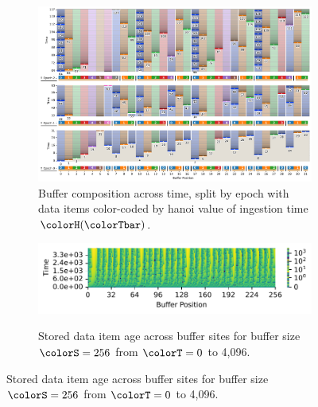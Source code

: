 \begin{figure}[htbp!]
  \centering

\begin{subfigure}[b]{\linewidth}
\includegraphics[width=\linewidth]{
binder/teeplots/20/num-generations=128+surface-size=32+viz=site-reservation-by-rank-spliced-at-heatmap+ext=}
\vspace{-4ex}\caption{
  Buffer composition across time, split by epoch with data items color-coded by hanoi value of ingestion time $\colorH(\colorTbar)$.
}
\label{fig:hsurf-tilted-implementation-schematic}
\end{subfigure}

\vspace{1ex}\begin{minipage}[]{\textwidth}
 \vspace{-2pt}
  \begin{subfigure}[t]{0.7\linewidth}
    \vspace{0pt}
    \centering
  \includegraphics[width=0.88\linewidth,clip]{binder/teeplots/20/cnorm=log+num-generations=4096+surface-size=256+viz=site-ingest-depth-by-rank-heatmap+ynorm=linear+ext=}
  \end{subfigure}%
  \begin{subfigure}[t]{0.3\linewidth}
  \vspace{-2pt}
  \caption{%
    Stored data item age across buffer sites for buffer size $\colorS=256$ from $\colorT=0$ to 4,096.
  }
  \label{fig:hsurf-tilted-implementation-heatmap}
\end{subfigure}
\end{minipage}


\end{figure}
